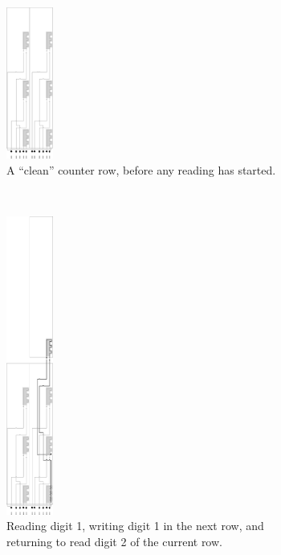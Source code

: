 \begin{figure}[H]
    \centering
    \begin{subfigure}[t]{0.2\textwidth}
        \centering
        \includegraphics[width=0.6in]{counter_read_start_general_case3_middle_level}
        \caption{\label{fig:counter_read_start_general_case3_middle_level} A ``clean'' counter row, before any reading has started.}
    \end{subfigure}%
    ~
    \begin{subfigure}[t]{0.2\textwidth}
        \centering
        \includegraphics[width=0.6in]{counter_read_digit1_return_read_digit2_general_case3_middle_level}
        \caption{\label{fig:counter_read_digit1_return_read_digit2_general_case3_middle_level} Reading digit 1, writing digit 1 in the next row, and returning to read digit 2 of the current row. }
    \end{subfigure}%
    ~
    \begin{subfigure}[t]{0.2\textwidth}
        \centering

\end{subfigure}
\end{figure}
